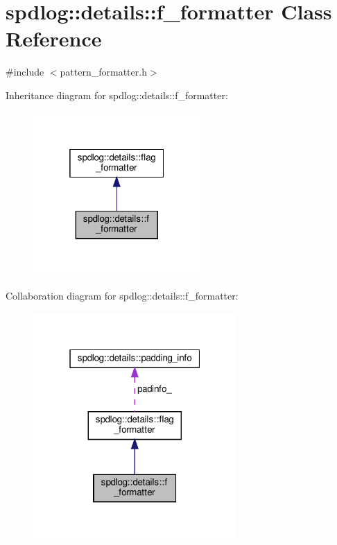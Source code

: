 \hypertarget{classspdlog_1_1details_1_1f__formatter}{}\section{spdlog\+:\+:details\+:\+:f\+\_\+formatter Class Reference}
\label{classspdlog_1_1details_1_1f__formatter}


{\ttfamily \#include $<$pattern\+\_\+formatter.\+h$>$}



Inheritance diagram for spdlog\+:\+:details\+:\+:f\+\_\+formatter\+:
\nopagebreak
\begin{figure}[H]
\begin{center}
\leavevmode
\includegraphics[width=181pt]{classspdlog_1_1details_1_1f__formatter__inherit__graph}
\end{center}
\end{figure}


Collaboration diagram for spdlog\+:\+:details\+:\+:f\+\_\+formatter\+:
\nopagebreak
\begin{figure}[H]
\begin{center}
\leavevmode
\includegraphics[width=220pt]{classspdlog_1_1details_1_1f__formatter__coll__graph}
\end{center}
\end{figure}
